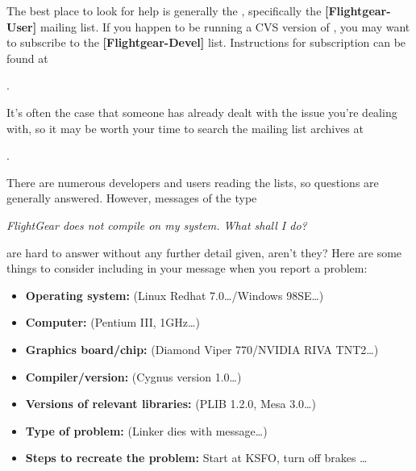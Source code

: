 The best place to look for help is generally the , specifically the  \textbf{[Flightgear-User]} mailing list. If you happen to be running a CVS version of \FlightGear{}, you may want to subscribe to the \textbf{[Flightgear-Devel]} list. Instructions for subscription can be
found at
 \medskip

.
 \medskip

\noindent
It's often the case that someone has already dealt with the issue you're dealing with, so it may be worth your time to search the mailing list archives at
 \medskip


.
 \medskip

\noindent
There are numerous developers and users reading the lists, so questions are generally answered. However, messages of the type

\textit{FlightGear does not compile on my system. What shall I do?}

 \noindent
are hard to answer without any further detail given, aren't they? Here are some things to consider including in your message when you report a problem:
 \medskip

\begin{itemize}
\item \textbf{Operating system:} (Linux Redhat 7.0\ldots/Windows 98SE\ldots)

\item \textbf{Computer:} (Pentium III, 1GHz\ldots)

\item \textbf{Graphics board/chip:} (Diamond Viper 770/NVIDIA RIVA TNT2\ldots)

\item \textbf{Compiler/version:} (Cygnus version 1.0\ldots)

\item \textbf{Versions of relevant libraries:} (PLIB 1.2.0, Mesa 3.0\ldots)

\item \textbf{Type of problem:} (Linker dies with message\ldots)

\item \textbf{Steps to recreate the problem:} Start at KSFO, turn off brakes \ldots

\end{itemize}

